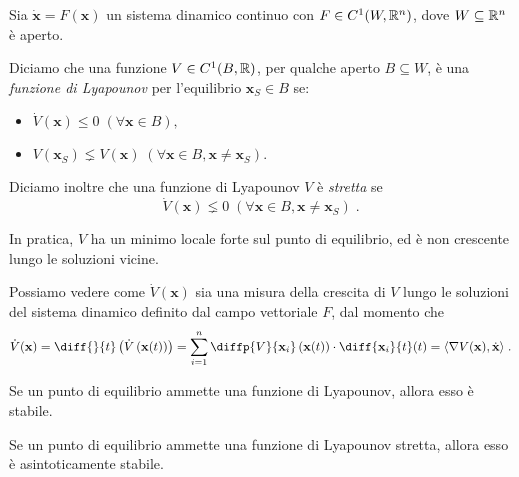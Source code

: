 \begin{definizione}
    Sia $\dot{\mathbf{x}} = F(\mathbf{x})$ un sistema dinamico continuo con $F \in C^1(W,\mathbb{R}^n)$, dove
    $W \subseteq \mathbb{R}^n$ è aperto.

    Diciamo che una funzione $V \in C^1(B, \mathbb{R})$, per qualche aperto $B \subseteq W$, è una
    \emph{funzione di Lyapounov} per l'equilibrio $\mathbf{x}_S \in B$ se:
    \begin{itemize}
        \item $\dot{V} ( \mathbf{x} ) \leq 0 \; (\forall \mathbf{x} \in B),$
        \item $V( \mathbf{x}_S ) \lneq V( \mathbf{x} ) \; (\forall \mathbf{x} \in B, \mathbf{x} \neq \mathbf{x}_S).$
    \end{itemize}

    Diciamo inoltre che una funzione di Lyapounov $V$ è \emph{stretta} se
    $$\dot{V}(\mathbf{x}) \lneq 0 \; (\forall \mathbf{x} \in B, \mathbf{x} \neq \mathbf{x}_S) \; .$$
\end{definizione}

In pratica, $V$ ha un minimo locale forte sul punto di equilibrio, ed è non crescente lungo le soluzioni vicine.

Possiamo vedere come $\dot{V} ( \mathbf{x} )$ sia una misura della crescita di $V$ lungo le soluzioni del sistema
dinamico definito dal campo vettoriale $F$, dal momento che
$$\dot{V} ( \mathbf{x} ) = \diff{}{t} \left( \dot{V} \left( \mathbf{x} (t) \right) \right) =
\sum_{i=1}^n \diffp{V}{{\mathbf{x}_i}} \left( \mathbf{x} (t) \right) \cdot \diff{ \mathbf{x}_i }{t} (t) =
\langle \nabla V ( \mathbf{x} ) , \dot{ \mathbf{x} } \rangle \; .$$

\begin{teorema}
    Se un punto di equilibrio ammette una funzione di Lyapounov, allora esso è stabile.
    \label{teo:lyapounovFunc}
\end{teorema}

\begin{corollario}
    Se un punto di equilibrio ammette una funzione di Lyapounov stretta, allora esso è asintoticamente stabile.
\end{corollario}
